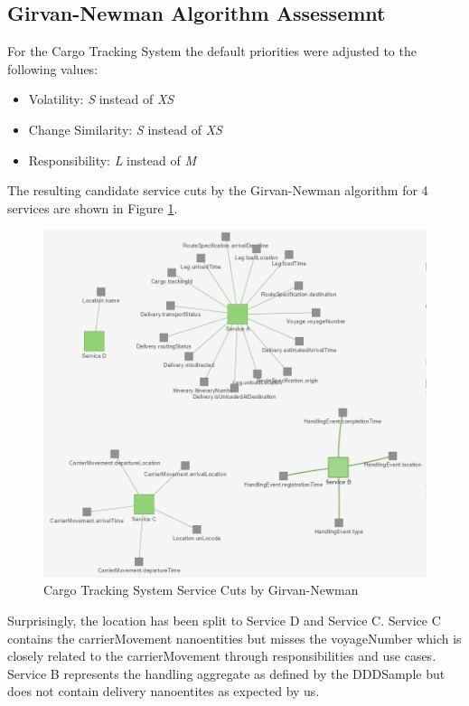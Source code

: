 \subsection{Girvan-Newman Algorithm Assessemnt}

For the Cargo Tracking System the default priorities were adjusted to the following values:

\begin{itemize}
	\item Volatility: \textit{S} instead of \textit{XS}
	\item Change Similarity: \textit{S} instead of \textit{XS}
	\item Responsibility: \textit{L} instead of \textit{M}
\end{itemize}

The resulting candidate service cuts by the Girvan-Newman algorithm for 4 services are shown in Figure \ref{fig:dddGirvanNewman}.

\begin{figure}[H]
	\includegraphics[scale=0.7]{images/ddd_girvan_4.png}
	\caption{Cargo Tracking System Service Cuts by Girvan-Newman}
	\label{fig:dddGirvanNewman}
\end{figure}

Surprisingly, the location has been split to Service D and Service C. Service C contains the carrierMovement nanoentities but misses the voyageNumber which is closely related to the carrierMovement through responsibilities and use cases. Service B represents the handling aggregate as defined by the DDDSample but does not contain delivery nanoentites as expected by us. 

